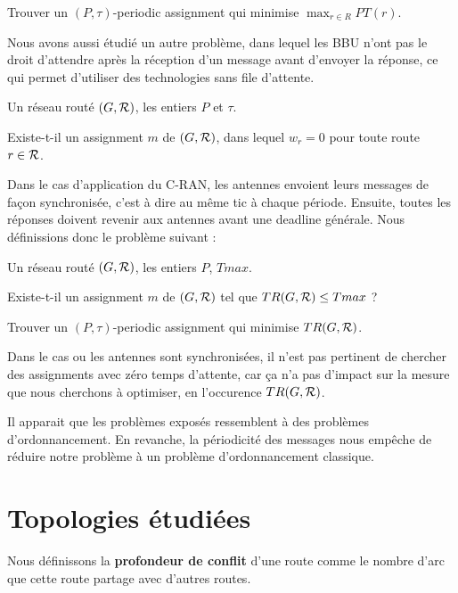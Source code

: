 \documentclass{article}
\begin{document}
        Trouver un $(P,\tau)$-periodic assignment qui minimise $\displaystyle \max_{r \in R} PT(r)$.
      
      Nous avons aussi étudié un autre problème, dans lequel les BBU n'ont pas le droit d'attendre après la réception d'un message avant d'envoyer la réponse, ce qui permet d'utiliser des technologies sans file d'attente.\\
         

        Un réseau routé $(G,{\cal R})$, les entiers $P$ et $\tau$.
      
       Existe-t-il un assignment $m$ de $(G,{\cal R})$, dans lequel $w_r = 0$ pour toute route $r \in {\cal R}$.

Dans le cas d'application du C-RAN, les antennes envoient leurs messages de façon synchronisée, c'est à dire au même tic à chaque période. Ensuite, toutes les réponses doivent revenir aux  antennes avant une deadline générale.
Nous définissions donc le problème suivant :
       

        Un réseau routé $(G,{\cal R})$, les entiers $P$, $Tmax$.
      
       Existe-t-il un assignment $m$ de $(G,{\cal R})$ tel que $ TR(G,{\cal R}) \leq Tmax$ ?

       Trouver un $(P,\tau)$-periodic assignment qui minimise  $TR(G,{\cal R})$.
    
Dans le cas ou les antennes sont synchronisées, il n'est pas pertinent de chercher des assignments avec zéro temps d'attente, car ça n'a pas d'impact sur la mesure que nous cherchons à optimiser, en l'occurence $TR(G,{\cal R})$.

Il apparait que les problèmes exposés ressemblent à des problèmes d'ordonnancement. En revanche, la périodicité des messages nous empêche de réduire notre problème à un problème d'ordonnancement classique.
  
\section{Topologies étudiées}
Nous définissons la {\bf profondeur de conflit} d'une route comme le nombre d'arc que cette route partage avec d'autres routes.
\end{document}
